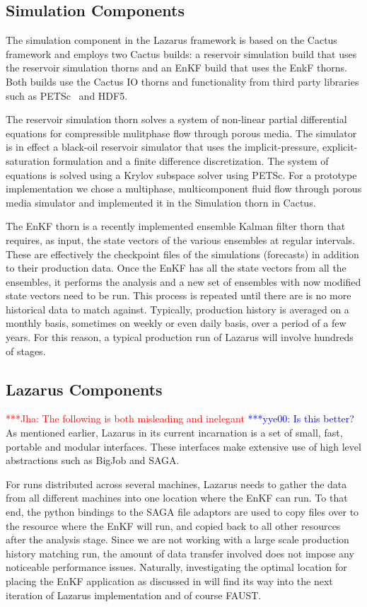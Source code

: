 \documentclass[conference,final]{IEEEtran}
\newcommand{\jhanote}[1]{ {\textcolor{red} { ***Jha: #1 }}}
\newcommand{\yyenote}[1]{ {\textcolor{blue} { ***yye00: #1 }}}
\newcommand{\jhanote}[1]{}
\newcommand{\yyenote}[1]{}
\begin{document}
\subsection{Simulation Components}
The simulation component in the Lazarus framework is based on the
Cactus framework and employs two Cactus builds: a reservoir simulation
build that uses the reservoir simulation thorns and an EnKF build that
uses the EnkF thorns. Both builds use the Cactus IO thorns and
functionality from third party libraries such as PETSc~\cite{PETSc}
and HDF5.

The reservoir simulation thorn solves a system of non-linear partial
differential equations for compressible mulitphase flow through porous
media. The simulator is in effect a black-oil reservoir simulator that
uses the implicit-pressure, explicit-saturation formulation and a
finite difference discretization. The system of equations is solved
using a Krylov subspace solver using PETSc. For a prototype
implementation we chose a multiphase, multicomponent fluid flow
through porous media simulator and implemented it in the Simulation
thorn in Cactus.

The EnKF thorn is a recently implemented ensemble Kalman filter
thorn that requires, as input, the state vectors of the various
ensembles at regular intervals. These are effectively the checkpoint
files of the simulations (forecasts) in addition to their production
data. Once the EnKF has all the state vectors from all the ensembles, 
it performs the analysis and a new set of ensembles with now modified
state vectors need to be run. This process is repeated until there
are is no more historical data to match against. Typically,
production history is averaged on a monthly basis, sometimes on weekly
or even daily basis, over a period of a few years. For this reason,
a typical production run of Lazarus will involve hundreds of stages.

\subsection{Lazarus Components}

\jhanote{The following is both misleading and inelegant} \yyenote{Is this better?}
As mentioned
earlier, Lazarus in its current incarnation is a set of small, fast,
portable and modular interfaces. These interfaces make extensive use
of high level abstractions such as BigJob and SAGA.

For runs distributed across several machines, Lazarus needs to gather
the data from all different machines into one location where the EnKF
can run. To that end, the python bindings to the SAGA file adaptors are used
to copy files over to the resource where the EnKF will run, and copied
back to all other resources after the analysis stage. Since we are not working
with a large scale production history matching run, the amount
of data transfer involved does not impose any noticeable performance issues. Naturally,
investigating the optimal location for placing the EnKF application
as discussed in \cite{escience07} will find its way into the next iteration
of Lazarus implementation and of course FAUST.
\end{document}

